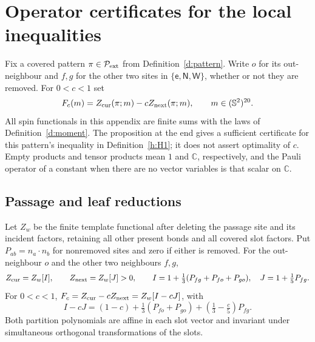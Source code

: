 

\section{Operator certificates for the local inequalities}\label{s:local-operator}

Fix a covered pattern \(\pi\in\mathcal P_{\rm ext}\) from
Definition~\ref{d:pattern}.  Write \(o\) for its out-neighbour and
\(f,g\) for the other two sites in
\(\{\mathsf e,\mathsf N,\mathsf W\}\), whether or not they are
removed.  For \(0<c<1\) set
\[
 F_c(m)=Z_{\rm cur}(\pi;m)-cZ_{\rm next}(\pi;m),
 \qquad m\in(\mathbb S^2)^{20}.
\]
All spin functionals in this appendix are finite sums with the laws
of Definition~\ref{d:moment}.  The proposition at the end gives a
sufficient certificate for this pattern's inequality in
Definition~\ref{h:H1}; it does not assert optimality of \(c\).
Empty products and tensor products mean \(1\) and \(\mathbb C\),
respectively, and the Pauli operator of a constant when there are
no vector variables is that scalar on \(\mathbb C\).

\subsection{Passage and leaf reductions}

\begin{lemma}\label{l:Iw}
Let \(Z_w\) be the finite template functional after deleting
the passage site and its incident factors, retaining all other
present bonds and all covered slot factors. Put \(P_{ab}=n_a\cdot n_b\)
for nonremoved sites and zero if either is removed.
For the out-neighbour \(o\) and the other two neighbours \(f,g\),
\[
 Z_{\rm cur}=Z_w[I],\qquad Z_{\rm next}=Z_w[J]>0,\qquad
 I=1+\tfrac13(P_{fg}+P_{fo}+P_{go}),\quad J=1+\tfrac15P_{fg}.
\]
For \(0<c<1\), \(F_c=Z_{\rm cur}-cZ_{\rm next}=Z_w[I-cJ]\), with
\[
 I-cJ=(1-c)+\tfrac13(P_{fo}+P_{go})+(\tfrac13-\tfrac c5)P_{fg}.
\]
Both partition polynomials are affine in each slot vector and
invariant under simultaneous orthogonal transformations of the slots.
\end{lemma}

